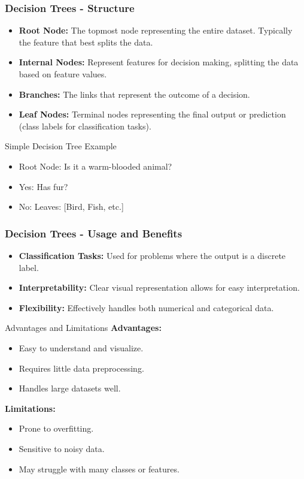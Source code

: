 \documentclass[aspectratio=169]{beamer}
\begin{document}
\begin{frame}[fragile]
    \frametitle{Decision Trees - Structure}
    \begin{itemize}
        \item \textbf{Root Node:} The topmost node representing the entire dataset. Typically the feature that best splits the data.
        \item \textbf{Internal Nodes:} Represent features for decision making, splitting the data based on feature values.
        \item \textbf{Branches:} The links that represent the outcome of a decision.
        \item \textbf{Leaf Nodes:} Terminal nodes representing the final output or prediction (class labels for classification tasks).
    \end{itemize}
    \begin{block}{Simple Decision Tree Example}
        \begin{itemize}
            \item Root Node: Is it a warm-blooded animal?
            \item Yes: Has fur?
            \item No: Leaves: [Bird, Fish, etc.]
        \end{itemize}
    \end{block}
\end{frame}

\begin{frame}[fragile]
    \frametitle{Decision Trees - Usage and Benefits}
    \begin{itemize}
        \item \textbf{Classification Tasks:} Used for problems where the output is a discrete label.
        \item \textbf{Interpretability:} Clear visual representation allows for easy interpretation.
        \item \textbf{Flexibility:} Effectively handles both numerical and categorical data.
    \end{itemize}
    \begin{block}{Advantages and Limitations}
        \textbf{Advantages:}
        \begin{itemize}
            \item Easy to understand and visualize.
            \item Requires little data preprocessing.
            \item Handles large datasets well.
        \end{itemize}
        \textbf{Limitations:}
        \begin{itemize}
            \item Prone to overfitting.
            \item Sensitive to noisy data.
            \item May struggle with many classes or features.
        \end{itemize}
    \end{block}
\end{frame}
\end{document}
